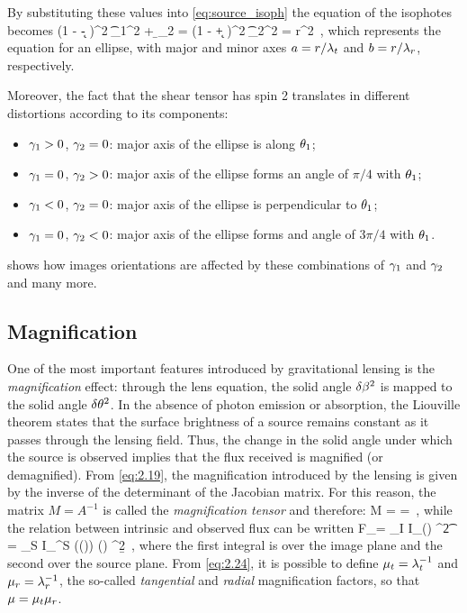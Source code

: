 By substituting these values into \cref{eq:source_isoph} the equation of the isophotes becomes
\be
\label{eq:ellipse_isoph}
(1 - \k - \g)^2 \t_1^2 + \b_2 = (1 - \k + \g)^2 \t_2^2 = r^2 \,,
\ee
which represents the equation for an ellipse, with major and minor axes $a = r/\lambda_t$ and $b = r/\lambda_r$, respectively.

Moreover, the fact that the shear tensor has spin 2 translates in different distortions according to its components:
\begin{itemize}
    \item $\gamma_1>0$, $\gamma_2 = 0$: major axis of the ellipse is along $\theta_1$;
    \item $\gamma_1=0$, $\gamma_2 > 0$: major axis of the ellipse forms an angle of $\pi/4$ with $\theta_1$;
    \item $\gamma_1<0$, $\gamma_2 = 0$: major axis of the ellipse is perpendicular to $\theta_1$;
    \item $\gamma_1=0$, $\gamma_2 < 0$: major axis of the ellipse forms and angle of $3\pi/4$ with $\theta_1$.
\end{itemize}

 shows how images orientations are affected by these combinations of $\gamma_1$ and $\gamma_2$ and many more.


\subsection{Magnification}
\label{subsec:magnification}
One of the most important features introduced by gravitational lensing is the \emph{magnification} effect: through the lens equation, the solid angle $\delta \beta^2$ is mapped to the solid angle $\delta \theta^2$. In the absence of photon emission or absorption, the Liouville theorem states that the surface brightness of a source remains constant as it passes through the lensing field. Thus, the change in the solid angle under which the source is observed implies that the flux received is magnified (or demagnified).
From \cref{eq:2.19}, the magnification introduced by the lensing is given by the inverse of the determinant of the Jacobian matrix. For this reason, the matrix $M = A^{-1}$ is called the \emph{magnification tensor} and therefore:
\be
\label{eq:2.24}
\m \equiv \det M =  =  \,,
\ee
while the relation between intrinsic and observed flux can be written
\be
\label{eq:2.25}
F_\n = \int_I I_\n (\va{\t}) \dd^2{\t} = \int_S I_\n^S (\va{\b}(\va{\t})) \m (\va{\t}) \dd^2{\b} \,,
\ee
where the first integral is over the image plane and the second over the source plane.
From \cref{eq:2.24}, it is possible to define $\mu_t = \lambda_t^{-1}$ and $\mu_r = \lambda_r^{-1}$, the so-called \emph{tangential} and \emph{radial} magnification factors, so that $\mu = \mu_t \mu_r$.

